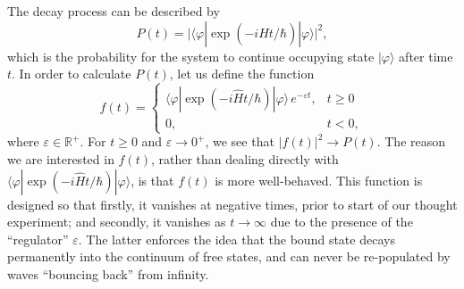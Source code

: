 \documentclass[pra,12pt]{revtex4}
\begin{document}
The decay process can be described by
\begin{equation}
  P(t) = \Big|\langle\varphi|\exp\left(-i\hat{H}t/\hbar\right)|\varphi\rangle\Big|^2,
\end{equation}
which is the probability for the system to continue occupying state
$|\varphi\rangle$ after time $t$.  In order to calculate $P(t)$, let
us define the function
\begin{equation}
  f(t) = \begin{cases} \langle\varphi|\exp\left(-i\hat{H}t/\hbar\right)|\varphi\rangle \,e^{-\varepsilon t}, & t \ge 0 \\ 0, & t < 0,\end{cases}
\end{equation}
where $\varepsilon \in \mathbb{R}^+$.  For $t \ge 0$ and $\varepsilon
\rightarrow 0^+$, we see that $|f(t)|^2 \rightarrow P(t)$.  The reason
we are interested in $f(t)$, rather than dealing directly with
$\langle\varphi|\exp(-i\hat{H}t/\hbar)|\varphi\rangle$, is that $f(t)$
is more well-behaved.  This function is designed so that firstly, it
vanishes at negative times, prior to start of our thought experiment;
and secondly, it vanishes as $t\rightarrow\infty$ due to the presence
of the ``regulator'' $\varepsilon$.  The latter enforces the idea that
the bound state decays permanently into the continuum of free states,
and can never be re-populated by waves ``bouncing back'' from
infinity.
\end{document}
